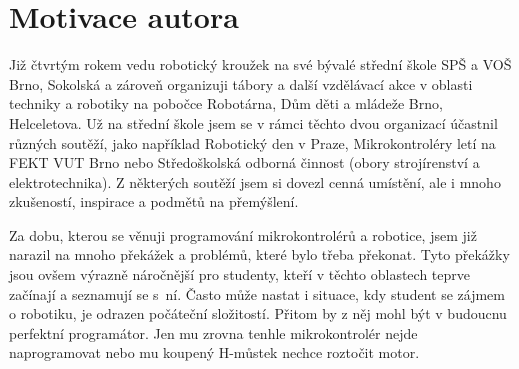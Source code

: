  
\addtocounter{footnote}{-1} %



%

\section{Motivace autora}

Již čtvrtým rokem vedu robotický kroužek na své bývalé střední škole SPŠ a VOŠ Brno, Sokolská a zároveň organizuji tábory a další vzdělávací akce v oblasti techniky a robotiky na pobočce Robotárna, Dům děti a mládeže Brno, Helceletova.
Už na střední škole jsem se v rámci těchto dvou organizací účastnil různých soutěží, jako například Robotický den v Praze, Mikrokontroléry letí na FEKT VUT Brno nebo Středoškolská odborná činnost (obory strojírenství a elektrotechnika). 
Z některých soutěží jsem si dovezl cenná umístění, ale i mnoho zkušeností, inspirace a podmětů na přemýšlení.

Za dobu, kterou se věnuji programování mikrokontrolérů a robotice, jsem již narazil na mnoho překážek a problémů, které bylo třeba překonat. 
Tyto překážky jsou ovšem výrazně náročnější pro studenty, kteří v těchto oblastech teprve začínají a seznamují se s~ní. 
Často může nastat i situace, kdy student se zájmem o robotiku, je odrazen počáteční složitostí. 
Přitom by z něj mohl být v budoucnu perfektní programátor. 
Jen mu zrovna tenhle mikrokontrolér nejde naprogramovat nebo mu koupený H-můstek nechce roztočit motor.

